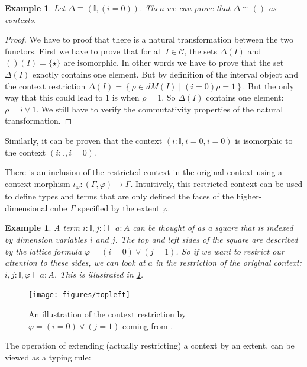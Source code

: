 \documentclass[12pt,a4paper,twoside,xetex]{book}
\newtheorem{example}[theorem]{Example}
\begin{document}
\begin{example}
Let $\Delta \equiv (\mathbb{I}, (i=0))$. Then we can prove that $\Delta \cong ()$ as contexts.
\end{example} 

\begin{proof}
We have to proof that there is a natural transformation between the two functors. First we have to prove that for all $I \in \mathcal{C}$, the sets $\Delta (I)$ and $()(I)=\{\star \}$ are isomorphic. In other words we have to prove that the set $\Delta (I)$ exactly contains one element. But by definition of the interval object and the context restriction $\Delta (I) = \left\{  \rho \in dM(I) \mid (i=0) \rho = 1 \right\}$. But the only way that this could lead to $1$ is when $\rho = 1$. So $\Delta (I)$ contains one element: $\rho = i \vee 1$. We still have to verify the commutativity properties of the natural transformation.
\end{proof}
 
 Similarly, it can be proven that the context $(i: \mathbb{I}, i=0, i=0)$ is isomorphic to the context $(i : \mathbb{I}, i = 0)$.

 
 
There is an inclusion of the restricted context in the original context using a context morphism $\iota_{\varphi} : (\Gamma , \varphi ) \rightarrow \Gamma $. Intuitively, this restricted context can be used to define types and terms that are only defined the faces of the higher-dimensional cube $\Gamma$ specified by the extent $\varphi$.  

\begin{example}
A term $i : \mathbb{I}, j: \mathbb{I} \vdash a : A$ can be thought of as a square that is indexed by dimension variables $i$ and $j$. The top and left sides of the square are described by the lattice formula $\varphi = (i=0) \vee (j=1)$. So if we want to restrict our attention to these sides, we can look at $a$ in the restriction of the original context: $i , j : \mathbb{I},  \varphi \vdash a : A$. This is illustrated in \cref{topleft}.
\end{example}

\begin{figure}
\centering
\texttt{[image: figures/topleft]}
\caption{An illustration of the context restriction by $\varphi = (i=0) \vee (j=1)$ coming from \cite{Orton2019}.\label{topleft}}
\end{figure}


The operation of extending (actually restricting) a context by an extent, can be viewed as a typing rule: 
\end{document}
